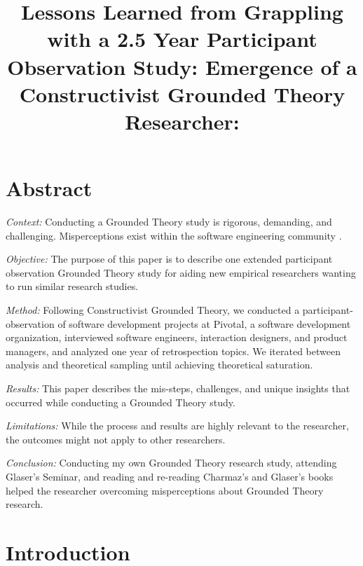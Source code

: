 
\title{Lessons Learned from Grappling with a 2.5 Year Participant Observation Study: Emergence of a Constructivist Grounded Theory Researcher: }

\author{
}
\maketitle

\section{Abstract}
 \textit{Context:} Conducting a Grounded Theory study is rigorous, demanding, and challenging. Misperceptions exist within the software engineering community \cite{StolGroundedTheory}.

\textit{Objective:} The purpose of this paper is to describe one extended participant observation Grounded Theory study for aiding new empirical researchers wanting to run similar research studies.

\textit{Method:} Following Constructivist Grounded Theory, we conducted a \durationOfResearchStudy{} participant-observation of \numberOfObservedProjects{} software development projects at Pivotal, a software development organization, interviewed \numberOfInterviews{} software engineers, interaction designers, and product managers, and analyzed one year of retrospection topics. We iterated between analysis and theoretical sampling until achieving theoretical saturation.

\textit{Results:}  This paper describes the mis-steps, challenges, and unique insights that occurred while conducting a Grounded Theory study.

\textit{Limitations:} While the process and results are highly relevant to the researcher, the outcomes might not apply to other researchers.

\textit{Conclusion:} Conducting my own Grounded Theory research study, attending Glaser's Seminar, and reading and re-reading Charmaz's and Glaser's books helped the researcher overcoming misperceptions about Grounded Theory research.
\section{Introduction}

